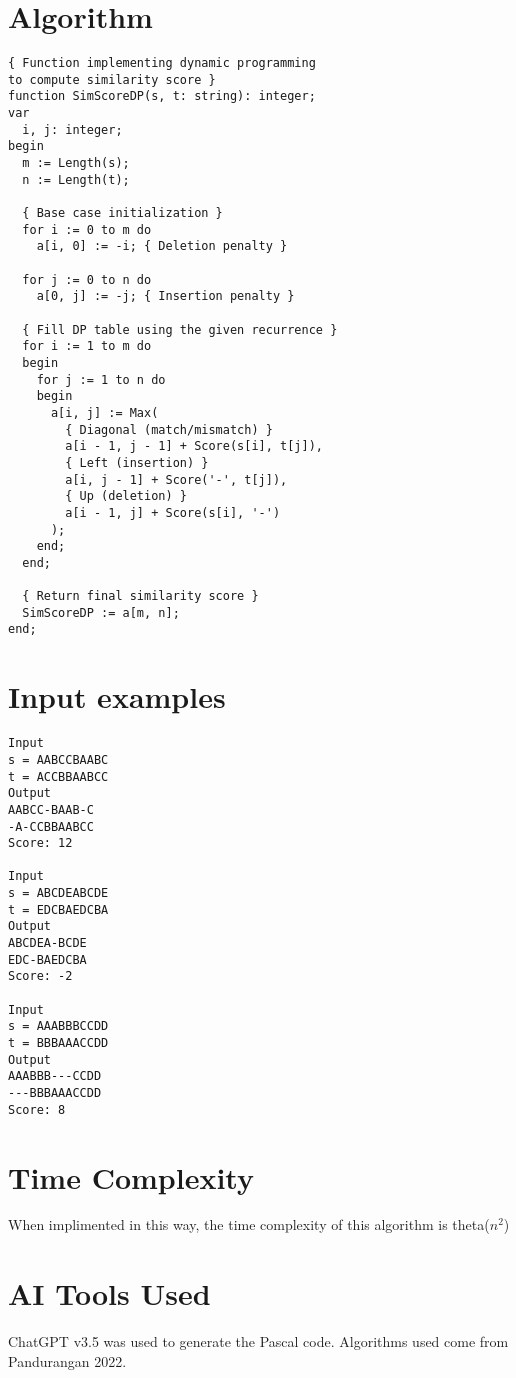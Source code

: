 \documentclass[conference]{IEEEtran}
\begin{document}
\section{Algorithm}
\begin{verbatim}
{ Function implementing dynamic programming 
to compute similarity score }
function SimScoreDP(s, t: string): integer;
var
  i, j: integer;
begin
  m := Length(s);
  n := Length(t);

  { Base case initialization }
  for i := 0 to m do
    a[i, 0] := -i; { Deletion penalty }

  for j := 0 to n do
    a[0, j] := -j; { Insertion penalty }

  { Fill DP table using the given recurrence }
  for i := 1 to m do
  begin
    for j := 1 to n do
    begin
      a[i, j] := Max(
        { Diagonal (match/mismatch) }
        a[i - 1, j - 1] + Score(s[i], t[j]),  
        { Left (insertion) }
        a[i, j - 1] + Score('-', t[j]),     
        { Up (deletion) }
        a[i - 1, j] + Score(s[i], '-')        
      );
    end;
  end;

  { Return final similarity score }
  SimScoreDP := a[m, n];
end;
\end{verbatim}


\section{Input examples}

\begin{verbatim}
Input
s = AABCCBAABC
t = ACCBBAABCC
Output
AABCC-BAAB-C
-A-CCBBAABCC
Score: 12

Input
s = ABCDEABCDE
t = EDCBAEDCBA
Output
ABCDEA-BCDE
EDC-BAEDCBA
Score: -2

Input
s = AAABBBCCDD
t = BBBAAACCDD
Output
AAABBB---CCDD
---BBBAAACCDD
Score: 8

\end{verbatim}

\section{Time Complexity}
When implimented in this way, the time complexity of this algorithm is theta($n^2$)

\section{AI Tools Used}
ChatGPT v3.5 was used to generate the Pascal code. Algorithms used come from Pandurangan 2022.
\end{document}
